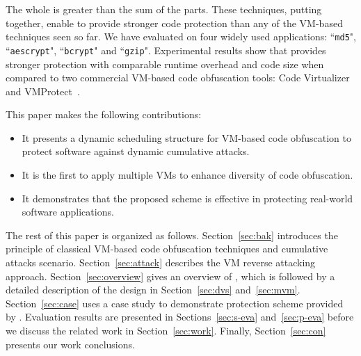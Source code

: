 The whole is greater than the sum of the parts. These techniques, putting together,
enable \DSVMP to provide stronger code protection than any of the VM-based techniques seen so far.
We have evaluated \DSVMP on four widely used applications:  ``\texttt{md5}", ``\texttt{aescrypt}", ``\texttt{bcrypt}" and ``\texttt{gzip}". Experimental results show that \DSVMP provides stronger protection with comparable runtime overhead and code size
when compared to two commercial VM-based code obfuscation tools: Code Virtualizer~\cite{2CV} and VMProtect~\cite{3Vmprotect}.


This paper makes the following contributions:
\begin{itemize}
  \item It presents a dynamic scheduling structure for VM-based code obfuscation to protect software against dynamic cumulative attacks.
  \item It is the first to apply multiple VMs to enhance diversity of code obfuscation.
  \item It demonstrates that the proposed scheme is effective in protecting real-world software applications.
\end{itemize}

The rest of this paper is organized as follows.
Section~\ref{sec:bak} introduces the principle of classical VM-based
code obfuscation techniques and cumulative attacks scenario.
Section~\ref{sec:attack} describes the VM reverse attacking approach.
Section~\ref{sec:overview} gives an overview of \DSVMP,
which is followed by a detailed description of the design in Section~\ref{sec:dvs} and~\ref{sec:mvm}.
Section~\ref{sec:case} uses a case study to demonstrate protection scheme provided by \DSVMP.
Evaluation results are presented in Sections~\ref{sec:s-eva} and~\ref{sec:p-eva} before we discuss the related work
in Section~\ref{sec:work}. Finally, Section~\ref{sec:con} presents our work conclusions.
